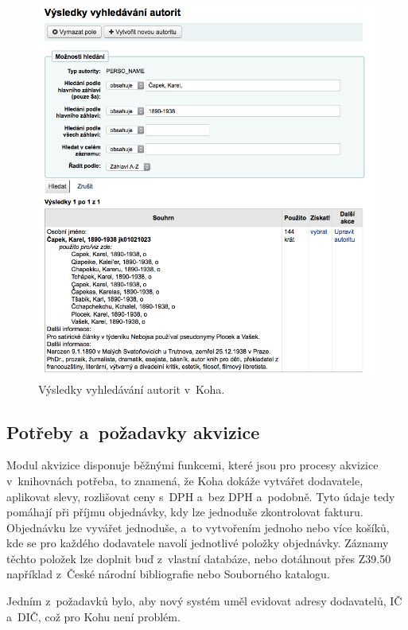 \documentclass[
	11pt, oneside, printed, final, palatino
	microtype,
	table,   %
	lof,     %
	lot     %
]{fithesis3}
\begin{document}
{\begin{figure}
    \centering
    \includegraphics[width=1.0\textwidth]{resources/vysledky_vyhledavani_autorit}
    \caption{Výsledky vyhledávání autorit v~Koha.}
    \label{fig:vysledky_vyhledavani_autorit}
\end{figure}

\subsection{Potřeby a~požadavky akvizice}
Modul akvizice disponuje běžnými funkcemi, které jsou pro procesy akvizice v~knihovnách potřeba, to znamená, že Koha dokáže vytvářet dodavatele, aplikovat slevy, rozlišovat ceny s~DPH a~bez DPH a~podobně. Tyto údaje tedy pomáhají při příjmu objednávky, kdy lze jednoduše zkontrolovat fakturu. Objednávku lze vyvářet jednoduše, a~to vytvořením jednoho nebo více košíků, kde se pro každého dodavatele navolí jednotlivé položky objednávky. Záznamy těchto položek lze doplnit buď z~vlastní databáze, nebo dotáhnout přes Z39.50 například z~České národní bibliografie nebo Souborného katalogu.

Jedním z~požadavků bylo, aby nový systém uměl evidovat adresy dodavatelů, IČ a~DIČ, což pro Kohu není problém.

}
\end{document}
